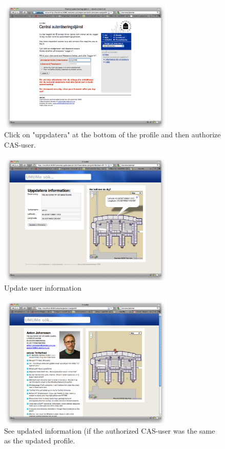 \documentclass[titlepage, twocolumn, a4paper, 10pt]{article}
\begin{document}
\begin{figure}[!thb]
  \centering
  \includegraphics[width=3.3in]{images/pic4.png}
  \caption{Click on "uppdatera" at the bottom of the profile and then authorize CAS-user.}
  \label{fig:images/cas}
\end{figure}

\begin{figure}[!thb]
  \centering
  \includegraphics[width=3.3in]{images/pic5.png}
  \caption{Update user information}
  \label{fig:images/edit}
\end{figure}

\begin{figure}[!thb]
  \centering
  \includegraphics[width=3.3in]{images/pic6.png}
  \caption{See updated information (if the authorized CAS-user was the same as the updated profile.}
  \label{fig:images/edited-user}
\end{figure}
\end{document}
